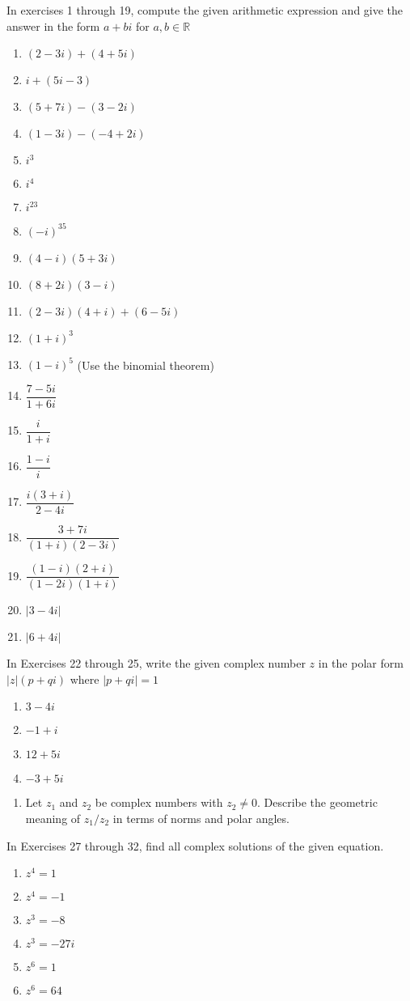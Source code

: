 \documentclass[10pt,letterpaper]{article}
\begin{document}
In exercises 1 through 19, compute the given arithmetic expression and give the answer in the form $a+bi$ for $a,b\in \mathbb{R}$
  \begin{enumerate}
    \item $(2-3i) + (4+5i)$ 
    \item $i + (5i-3)$
    \item $(5+7i) - (3-2i)$
    \item $(1-3i) - (-4+2i)$
    \item $i^3$
    \item $i^4$
    \item $i^{23}$
    \item $(-i)^{35}$
    \item $(4-i)(5+3i)$
    \item $(8+2i)(3-i)$
    \item $(2-3i)(4+i) + (6-5i)$
    \item $(1+i)^3$
    \item $(1-i)^5$ (Use the binomial theorem)
    \item $\dfrac{7-5i}{1+6i}$
    \item $\dfrac{i}{1+i}$
    \item $\dfrac{1-i}{i}$
    \item $\dfrac{i(3+i)}{2-4i}$ 
    \item $\dfrac{3+7i}{(1+i)(2-3i)}$
    \item $\dfrac{(1-i)(2+i)}{(1-2i)(1+i)}$
    \item $\lvert3-4i\rvert$
    \item $\lvert6+4i\rvert$
  \end{enumerate}

In Exercises 22 through 25, write the given complex number $z$ in the polar form $\lvert z \rvert (p+qi) $ where $\lvert p+qi \rvert =1$
  \begin{enumerate}[resume]
    \item $3-4i$
    \item $-1+i$
    \item $12+5i$
    \item $-3+5i$
  \end{enumerate}

  \begin{enumerate}[resume]
    \item Let $z_1$ and $z_2$ be complex numbers with $z_2 \ne 0$. Describe the geometric meaning of $z_1/z_2$ in terms of norms and polar angles.
  \end{enumerate}
  \pagebreak
In Exercises 27 through 32, find all complex solutions of the given equation.
  \begin{enumerate}[resume]
    \item $z^4=1$
    \item $z^4=-1$
    \item $z^3=-8$
    \item $z^3=-27i$
    \item $z^6=1$
    \item $z^6=64$
  \end{enumerate}
\end{document}
